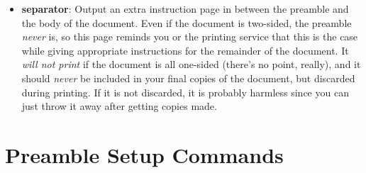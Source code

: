 \documentclass[letterpaper,phd,prettyheadings,chaptercenter,parttop]{byumsphd}
\begin{document}
\begin{itemize}
\begin{itemize}
            \item \textbf{separator}: Output an extra instruction page in between the preamble and the body of the document.  Even if the document is two-sided, the preamble \emph{never} is, so this page reminds you or the printing service that this is the case while giving appropriate instructions for the remainder of the document.  It \emph{will not print} if the document is all one-sided (there's no point, really), and it should \emph{never} be included in your final copies of the document, but discarded during printing.  If it is not discarded, it is probably harmless since you can just throw it away after getting copies made.
        \end{itemize}
\end{itemize}

\section{Preamble Setup Commands}
\end{document}
